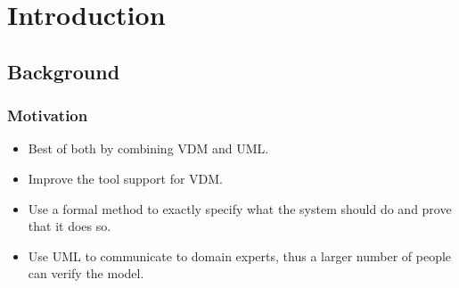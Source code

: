 %
%
\section{Introduction}

\subsection{Background}

%
%
\frame
{
 \frametitle{Motivation}
  \begin{itemize}%
\itemsep=1cm
  \item Best of both by combining VDM and UML.
  \item Improve the tool support for VDM.
  \end{itemize}
}
%
%
%

\note
{

  \begin{itemize}
  		\item Use a formal method to exactly specify what the system should do and prove that it does so.
  		\item Use UML to communicate to domain experts, thus a larger number of people can verify the model.
  		
  \end{itemize}



}

